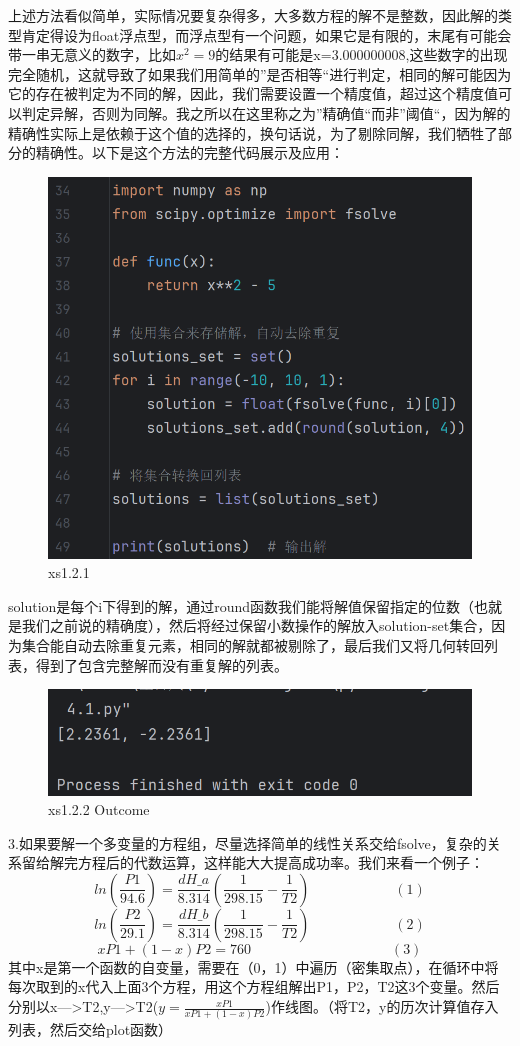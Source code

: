 \documentclass[12pt]{article}
\begin{document}
上述方法看似简单，实际情况要复杂得多，大多数方程的解不是整数，因此解的类型肯定得设为float浮点型，而浮点型有一个问题，如果它是有限的，末尾有可能会带一串无意义的数字，比如\(x^2=9\)的结果有可能是x=3.000000008,这些数字的出现完全随机，这就导致了如果我们用简单的”是否相等“进行判定，相同的解可能因为它的存在被判定为不同的解，因此，我们需要设置一个精度值，超过这个精度值可以判定异解，否则为同解。我之所以在这里称之为”精确值“而非”阈值“，因为解的精确性实际上是依赖于这个值的选择的，换句话说，为了剔除同解，我们牺牲了部分的精确性。以下是这个方法的完整代码展示及应用：
\begin{figure}[H]
    \centering
    \includegraphics[width=0.75\linewidth]{解方程 program3.png}
    \caption{xs1.2.1}
    \label{fig:enter-label}
\end{figure}
solution是每个i下得到的解，通过round函数我们能将解值保留指定的位数（也就是我们之前说的精确度），然后将经过保留小数操作的解放入solution-set集合，因为集合能自动去除重复元素，相同的解就都被剔除了，最后我们又将几何转回列表，得到了包含完整解而没有重复解的列表。
\begin{figure}[H]
    \centering
    \includegraphics[width=0.75\linewidth]{解方程 outcome3.png}
    \caption{xs1.2.2 Outcome}
    \label{fig:enter-label}
\end{figure}

3.如果要解一个多变量的方程组，尽量选择简单的线性关系交给fsolve，复杂的关系留给解完方程后的代数运算，这样能大大提高成功率。我们来看一个例子：
\[ln(\frac{P1}{94.6})=\frac{dH\_a}{8.314}(\frac{1}{298.15}-\frac{1}{T2})\qquad \qquad \qquad (1)\] 
\[ln(\frac{P2}{29.1})=\frac{dH\_b}{8.314}(\frac{1}{298.15}-\frac{1}{T2}) \qquad \qquad \qquad (2)\]
\[xP1+(1-x)P2=760 \qquad \qquad \quad \quad \qquad \qquad(3)\]
其中x是第一个函数的自变量，需要在（0，1）中遍历（密集取点），在循环中将每次取到的x代入上面3个方程，用这个方程组解出P1，P2，T2这3个变量。然后分别以x--->T2,y--->T2(\(y=\frac{xP1}{xP1+(1-x)P2}\))作线图。（将T2，y的历次计算值存入列表，然后交给plot函数）
\end{document}
